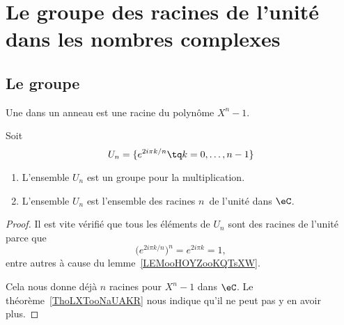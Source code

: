 
\section{Le groupe des racines de l'unité dans les nombres complexes}
\label{SecGJOLooWdMYVl}

\subsection{Le groupe}

\begin{definition}      \label{DEFooDUWPooZaAByH}
	Une  dans un anneau est une racine du polynôme \( X^n-1\).
\end{definition}

\begin{lemmaDef}        \label{LEMooSXFBooYJmRTK}
	Soit
	\begin{equation}        \label{EqIEAXooIpvFPe}
		U_n=\{ e^{2i\pi k/n}  \tq k=0,\ldots, n-1 \}
	\end{equation}
	\begin{enumerate}
		\item
		      L'ensemble \( U_n\) est un groupe pour la multiplication.
		\item
		      L'ensemble \( U_n\) est l'ensemble des racines \( n\)\ieme\ de l'unité dans \( \eC\).
	\end{enumerate}
\end{lemmaDef}

\begin{proof}
	Il est vite vérifié que tous les éléments de \( U_n\) sont des racines de l'unité parce que
	\begin{equation}
		\big(  e^{2i\pi k/n} \big)^n= e^{2i\pi k}=1,
	\end{equation}
	entre autres à cause du lemme~\ref{LEMooHOYZooKQTsXW}.

	Cela nous donne déjà \( n\) racines pour \( X^n-1\) dans \( \eC\). Le théorème~\ref{ThoLXTooNaUAKR} nous indique qu'il ne peut pas y en avoir plus.
\end{proof}

